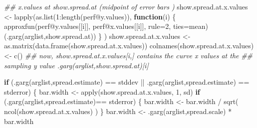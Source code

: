\documentclass[
  letterpaper,
  DIV=11,
  numbers=noendperiod]{scrartcl}
\newenvironment{Shaded}{\begin{snugshade}}{\end{snugshade}}
\newcommand{\AttributeTok}[1]{\textcolor[rgb]{0.40,0.45,0.13}{#1}}
\newcommand{\ControlFlowTok}[1]{\textcolor[rgb]{0.00,0.23,0.31}{\textbf{#1}}}
\newcommand{\DecValTok}[1]{\textcolor[rgb]{0.68,0.00,0.00}{#1}}
\newcommand{\DocumentationTok}[1]{\textcolor[rgb]{0.37,0.37,0.37}{\textit{#1}}}
\newcommand{\FunctionTok}[1]{\textcolor[rgb]{0.28,0.35,0.67}{#1}}
\newcommand{\NormalTok}[1]{\textcolor[rgb]{0.00,0.23,0.31}{#1}}
\newcommand{\OtherTok}[1]{\textcolor[rgb]{0.00,0.23,0.31}{#1}}
\newcommand{\SpecialCharTok}[1]{\textcolor[rgb]{0.37,0.37,0.37}{#1}}
\newcommand{\StringTok}[1]{\textcolor[rgb]{0.13,0.47,0.30}{#1}}
\begin{document}
\begin{Shaded}
\begin{Highlighting}[]
    \DocumentationTok{\#\# x.values at show.spread.at (midpoint of error bars )}
\NormalTok{    show.spread.at.x.values }\OtherTok{\textless{}{-}}
      \FunctionTok{lapply}\NormalTok{(}\FunctionTok{as.list}\NormalTok{(}\DecValTok{1}\SpecialCharTok{:}\FunctionTok{length}\NormalTok{(perf}\SpecialCharTok{@}\NormalTok{y.values)),}
             \ControlFlowTok{function}\NormalTok{(i) \{}
                 \FunctionTok{approxfun}\NormalTok{(perf}\SpecialCharTok{@}\NormalTok{y.values[[i]],}
\NormalTok{                           perf}\SpecialCharTok{@}\NormalTok{x.values[[i]],}
                           \AttributeTok{rule=}\DecValTok{2}\NormalTok{, }\AttributeTok{ties=}\NormalTok{mean)(}\FunctionTok{.garg}\NormalTok{(arglist,}\StringTok{\textquotesingle{}show.spread.at\textquotesingle{}}\NormalTok{))}
\NormalTok{             \} )}
\NormalTok{    show.spread.at.x.values }\OtherTok{\textless{}{-}} \FunctionTok{as.matrix}\NormalTok{(}\FunctionTok{data.frame}\NormalTok{(show.spread.at.x.values))}
    \FunctionTok{colnames}\NormalTok{(show.spread.at.x.values) }\OtherTok{\textless{}{-}} \FunctionTok{c}\NormalTok{()}
    \DocumentationTok{\#\# now, show.spread.at.x.values[i,] contains the curve x values at the}
    \DocumentationTok{\#\# sampling y value .garg(arglist,\textquotesingle{}show.spread.at\textquotesingle{})[i]}
    
    \ControlFlowTok{if}\NormalTok{ (}\FunctionTok{.garg}\NormalTok{(arglist,}\StringTok{\textquotesingle{}spread.estimate\textquotesingle{}}\NormalTok{) }\SpecialCharTok{==} \StringTok{\textquotesingle{}stddev\textquotesingle{}} \SpecialCharTok{||}
        \FunctionTok{.garg}\NormalTok{(arglist,}\StringTok{\textquotesingle{}spread.estimate\textquotesingle{}}\NormalTok{) }\SpecialCharTok{==} \StringTok{\textquotesingle{}stderror\textquotesingle{}}\NormalTok{) \{}
\NormalTok{        bar.width }\OtherTok{\textless{}{-}} \FunctionTok{apply}\NormalTok{(show.spread.at.x.values, }\DecValTok{1}\NormalTok{, sd)}
        \ControlFlowTok{if}\NormalTok{ (}\FunctionTok{.garg}\NormalTok{(arglist,}\StringTok{\textquotesingle{}spread.estimate\textquotesingle{}}\NormalTok{)}\SpecialCharTok{==} \StringTok{\textquotesingle{}stderror\textquotesingle{}}\NormalTok{) \{}
\NormalTok{            bar.width }\OtherTok{\textless{}{-}}\NormalTok{ bar.width }\SpecialCharTok{/} \FunctionTok{sqrt}\NormalTok{( }\FunctionTok{ncol}\NormalTok{(show.spread.at.x.values) )}
\NormalTok{        \}}
\NormalTok{        bar.width }\OtherTok{\textless{}{-}} \FunctionTok{.garg}\NormalTok{(arglist,}\StringTok{\textquotesingle{}spread.scale\textquotesingle{}}\NormalTok{) }\SpecialCharTok{*}\NormalTok{ bar.width}


\end{Highlighting}
\end{Shaded}
\end{document}
